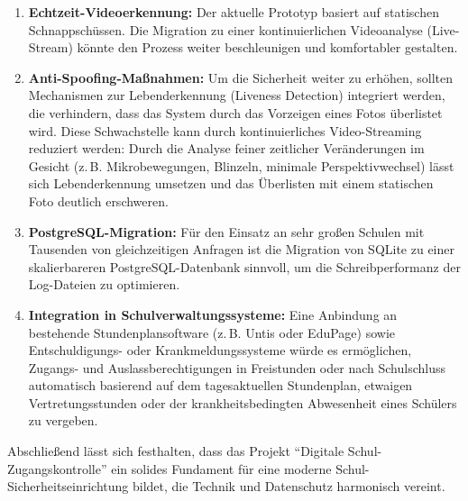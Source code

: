 \begin{enumerate}
    \item \textbf{Echtzeit-Videoerkennung:} Der aktuelle Prototyp basiert auf statischen Schnappschüssen. Die Migration zu einer kontinuierlichen Videoanalyse (Live-Stream) könnte den Prozess weiter beschleunigen und komfortabler gestalten.
    \item \textbf{Anti-Spoofing-Maßnahmen:} Um die Sicherheit weiter zu erhöhen, sollten Mechanismen zur Lebenderkennung (Liveness Detection) integriert werden, die verhindern, dass das System durch das Vorzeigen eines Fotos überlistet wird. Diese Schwachstelle kann durch kontinuierliches Video-Streaming reduziert werden: Durch die Analyse feiner zeitlicher Veränderungen im Gesicht (z.\,B. Mikrobewegungen, Blinzeln, minimale Perspektivwechsel) lässt sich Lebenderkennung umsetzen und das Überlisten mit einem statischen Foto deutlich erschweren.
    \item \textbf{PostgreSQL-Migration:} Für den Einsatz an sehr großen Schulen mit Tausenden von gleichzeitigen Anfragen ist die Migration von SQLite zu einer skalierbareren PostgreSQL-Datenbank sinnvoll, um die Schreibperformanz der Log-Dateien zu optimieren.
    \item \textbf{Integration in Schulverwaltungssysteme:} Eine Anbindung an bestehende Stundenplansoftware (z.\,B. Untis oder EduPage) sowie Entschuldigungs- oder Krankmeldungssysteme würde es ermöglichen, Zugangs- und Auslassberechtigungen in Freistunden oder nach Schulschluss automatisch basierend auf dem tagesaktuellen Stundenplan, etwaigen Vertretungsstunden oder der krankheitsbedingten Abwesenheit eines Schülers zu vergeben.
\end{enumerate}

Abschließend lässt sich festhalten, dass das Projekt \enquote{Digitale Schul-Zugangskontrolle} ein solides Fundament für eine moderne Schul-Sicherheitseinrichtung bildet, die Technik und Datenschutz harmonisch vereint.


